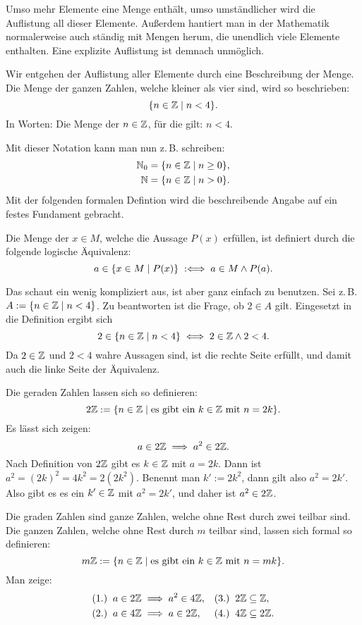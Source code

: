 Umso mehr Elemente eine Menge enthält, umso umständlicher wird
die Auflistung all dieser Elemente. Außerdem hantiert man in der
Mathematik normalerweise auch ständig mit Mengen herum, die
unendlich viele Elemente enthalten. Eine explizite Auflistung ist
demnach unmöglich.

Wir entgehen der Auflistung aller Elemente durch eine Beschreibung
der Menge. Die Menge der ganzen Zahlen, welche kleiner als vier sind,
wird so beschrieben:%
\[\{n\in\mathbb Z\mid n<4\}.\]
In Worten: Die Menge der $n\in\mathbb Z$, für die gilt: $n<4$.

Mit dieser Notation kann man nun z.\,B. schreiben:%
\begin{align*}
\mathbb N_0 &= \{n\in\mathbb Z\mid n\ge 0\},\\
\mathbb N &= \{n\in\mathbb Z\mid n>0\}.
\end{align*}
Mit der folgenden formalen Defintion wird die beschreibende Angabe
auf ein festes Fundament gebracht.

\begin{Definition}%
\label{def:set-builder-bounded}
Die Menge der $x\in M$, welche die Aussage $P(x)$ erfüllen,
ist definiert durch die folgende logische Äquivalenz:%
\[a\in\{x\in M\mid P(x)\} \;:\Longleftrightarrow\; a\in M\land P(a).\]
\end{Definition}
Das schaut ein wenig kompliziert aus, ist aber ganz einfach zu
benutzen. Sei z.\,B. $A:=\{n\in\mathbb Z\mid n<4\}$. Zu beantworten ist
die Frage, ob $2\in A$ gilt. Eingesetzt in die Definition
ergibt sich%
\[2\in\{n\in\mathbb Z\mid n<4\}\iff 2\in\mathbb Z\land 2<4.\]
Da $2\in\mathbb Z$ und $2<4$ wahre Aussagen sind, ist die rechte Seite
erfüllt, und damit auch die linke Seite der Äquivalenz.

Die geraden Zahlen lassen sich so definieren:%
\[2\mathbb Z:=\{n\in\mathbb Z\mid\text{es gibt ein $k\in\mathbb Z$ mit $n=2k$}\}.\]
Es lässt sich zeigen:
\[a\in 2\mathbb Z\implies a^2\in 2\mathbb Z.\]
Nach Definition von $2\mathbb Z$ gibt es $k\in\mathbb Z$ mit $a=2k$.
Dann ist $a^2=(2k)^2=4k^2=2(2k^2)$. Benennt man $k':=2k^2$, dann
gilt also $a^2=2k'$. Also gibt es es ein $k'\in\mathbb Z$
mit $a^2=2k'$, und daher ist $a^2\in 2\mathbb Z$.

Die graden Zahlen sind ganze Zahlen, welche ohne Rest durch zwei teilbar
sind. Die ganzen Zahlen, welche ohne Rest durch $m$ teilbar sind,
lassen sich formal so definieren:%
\[m\mathbb Z:=\{n\in\mathbb Z\mid\text{es gibt ein $k\in\mathbb Z$ mit $n=mk$}\}.\]
Man zeige:
\begin{align*}
& (1.)\;\;a\in 2\mathbb Z\implies a^2\in 4\mathbb Z, && (3.)\;\;2\mathbb Z\subseteq\mathbb Z,\\
& (2.)\;\;a\in 4\mathbb Z\implies a\in 2\mathbb Z,   && (4.)\;\;4\mathbb Z\subseteq 2\mathbb Z.
\end{align*}


